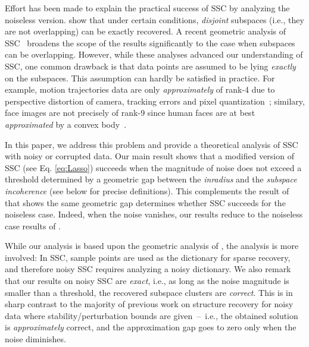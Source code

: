 \documentclass[main]{subfiles}
\begin{document}
Effort has been made to explain the practical success of SSC by analyzing the noiseless version. \cite{elhamifar2010ssc_icassp} show that under certain conditions, \emph{disjoint} subspaces (i.e., they are not overlapping) can be exactly recovered.
A recent geometric analysis of SSC~\cite{soltanolkotabi2011geometric} broadens the scope of the results significantly to the case when subspaces can be overlapping. However, while these analyses advanced our understanding of SSC, one common drawback
is that data points are assumed to be lying {\em exactly} on the subspaces. This assumption can hardly be satisfied in practice. For example, motion trajectories data are only {\em approximately} of rank-4 due to perspective distortion of camera, tracking errors and pixel quantization~\cite{costeira1998motion_seg}; similary, face images are   not precisely of rank-9 since human faces are at best {\em approximated} by a convex body~\cite{basri2003lambertianface}.

In this paper, we address this problem and provide a theoretical analysis of SSC with noisy or corrupted data. Our main result shows that a modified version of SSC (see Eq. \eqref{eq:Lasso}) succeeds when the magnitude of noise does not exceed a threshold determined by a geometric gap between the \emph{inradius} and the \emph{subspace incoherence} (see below for precise definitions). This complements the result of \cite{soltanolkotabi2011geometric} that shows the same geometric gap determines whether SSC succeeds for the noiseless case. Indeed,  when the noise vanishes, our results reduce to the noiseless case results of \cite{soltanolkotabi2011geometric}.

While our analysis is based upon the geometric analysis of \cite{soltanolkotabi2011geometric}, the analysis is more involved: In SSC, sample points are used as the dictionary for sparse recovery, and therefore noisy SSC requires analyzing a noisy dictionary.
We also remark that our results on noisy SSC are {\em exact}, i.e., as long as the noise magnitude is smaller than a threshold, the recovered subspace clusters are {\em correct}.
This is in sharp contrast to the majority of previous work on structure recovery for noisy data where stability/perturbation bounds are given~--~i.e., the obtained solution is {\em approximately} correct, and the approximation gap goes to zero only when the noise diminishes.
\end{document}
